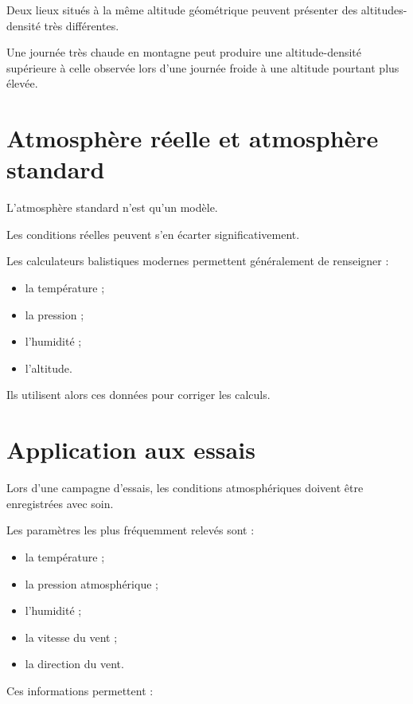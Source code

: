 Deux lieux situés à la même altitude géométrique peuvent présenter des
altitudes-densité très différentes.

\begin{exemple}

Une journée très chaude en montagne peut produire une altitude-densité
supérieure à celle observée lors d'une journée froide à une altitude pourtant
plus élevée.

\end{exemple}

\section{Atmosphère réelle et atmosphère standard}

L'atmosphère standard n'est qu'un modèle.

Les conditions réelles peuvent s'en écarter significativement.

Les calculateurs balistiques modernes permettent généralement de renseigner :

\begin{itemize}
\item la température ;
\item la pression ;
\item l'humidité ;
\item l'altitude.
\end{itemize}

Ils utilisent alors ces données pour corriger les calculs.

\section{Application aux essais}

Lors d'une campagne d'essais, les conditions atmosphériques doivent être
enregistrées avec soin.

Les paramètres les plus fréquemment relevés sont :

\begin{itemize}
\item la température ;
\item la pression atmosphérique ;
\item l'humidité ;
\item la vitesse du vent ;
\item la direction du vent.
\end{itemize}

Ces informations permettent :

